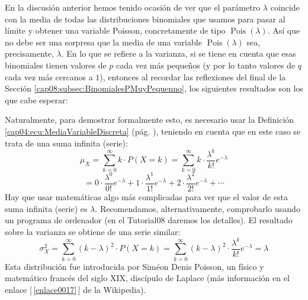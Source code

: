 En la discusión anterior hemos tenido ocasión de ver que el parámetro $\lambda$ coincide con la
media de todas las distribuciones binomiales que usamos para pasar al límite y obtener una variable
Poisson, concretamente de tipo $\operatorname{Pois}(\lambda)$. Así que no debe ser una sorpresa que
la media de una variable $\operatorname{Pois}(\lambda)$ sea, precisamente,  $\lambda$. En lo que se
refiere a la varianza, si se tiene en cuenta que esas binomiales tienen valores de $p$ cada vez más
pequeños (y por lo tanto valores de $q$ cada vez más cercanos a $1$), entonces al recordar las
reflexiones del final de la Sección \ref{cap08:subsec:BinomialesPMuyPequenno}, los siguientes
resultados son los que cabe esperar:
    \begin{center}
    \end{center}

Naturalmente, para demostrar formalmente esto, es necesario usar la Definición
\ref{cap04:ecu:MediaVariableDiscreta} (pág. \pageref{cap04:ecu:MediaVariableDiscreta}),  teniendo
en cuenta que en este caso se trata de una suma infinita (serie):
    \[\mu_X=\sum_{k=0}^{\infty} k\cdot P(X=k)=
    \sum_{k=0}^{\infty} k\cdot \dfrac{\lambda^k}{k!}e^{-\lambda}\]
    \[=    0\cdot\dfrac{\lambda^0}{0!}e^{-\lambda}+
    1\cdot\dfrac{\lambda^1}{1!}e^{-\lambda}+
    2\cdot\dfrac{\lambda^2}{2!}e^{-\lambda}+\cdots\]
Hay que usar matemáticas algo más complicadas para ver que el valor de esta suma infinita (serie) es $\lambda$. Recomendamos, alternativamente, comprobarlo usando un programa de ordenador (en el Tutorial08 daremos los detalles). El resultado sobre la varianza se
obtiene de una serie similar:
    \[\sigma^2_X=\sum_{k=0}^{\infty} (k-\lambda)^2\cdot P(X=k)=
    \sum_{k=0}^{\infty} (k-\lambda)^2\cdot \dfrac{\lambda^k}{k!}e^{-\lambda}=
    \lambda\]
Esta distribución fue introducida por Siméon Denis Poisson, un físico y matemático francés del siglo XIX, discípulo de Laplace (más información en el enlace [\,\ref{enlace0017}\,]\label{enlace0017a}
de la Wikipedia).


